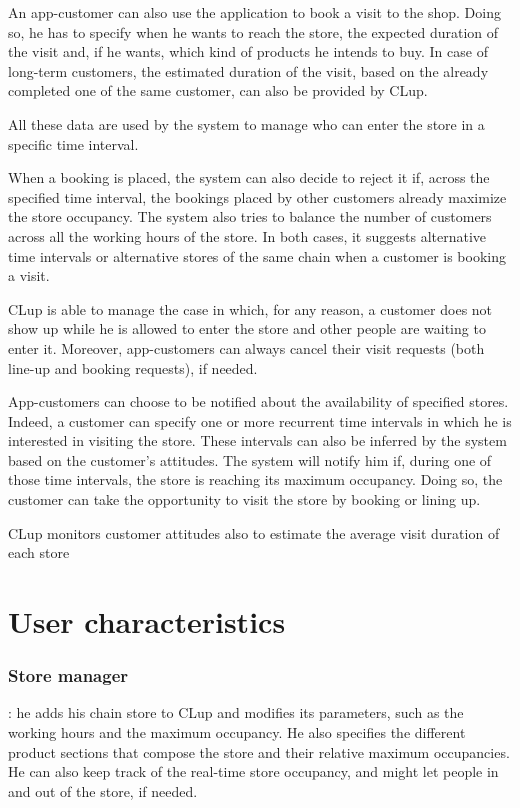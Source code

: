 \documentclass[a4paper,oneside,11pt]{book}   %
\begin{document}
    An app-customer can also use the application to book a visit to the shop. Doing so, he has to specify when he wants to reach the store, the expected duration of the visit and, if he wants, which kind of products he intends to buy. In case of long-term customers, the estimated duration of the visit, based on the already completed one of the same customer, can also be provided by CLup. \par
    All these data are used by the system to manage who can enter the store in a specific time interval. \par
    When a booking is placed, the system can also decide to reject it if, across the specified time interval, the bookings placed by other customers already maximize the store occupancy. The system also tries to balance the number of customers across all the working hours of the store. In both cases, it suggests alternative time intervals or alternative stores of the same chain when a customer is booking a visit. \par
    CLup is able to manage the case in which, for any reason, a customer does not show up while he is allowed to enter the store and other people are waiting to enter it. Moreover, app-customers can always cancel their visit requests (both line-up and booking requests), if needed. \par
    App-customers can choose to be notified about the availability of specified stores. Indeed, a customer can specify one or more recurrent time intervals in which he is interested in visiting the store. These intervals can also be inferred by the system based on the customer’s attitudes. The system will notify him if, during one of those time intervals, the store is reaching its maximum occupancy. Doing so, the customer can take the opportunity to visit the store by booking or lining up. \par
    CLup monitors customer attitudes also to estimate the average visit duration of each store

    \section{User characteristics}
    \subsubsection{Store manager}: he adds his chain store to CLup and modifies its parameters, such as the working hours and the maximum occupancy. He also specifies the different product sections that compose the store and their relative maximum occupancies. He can also keep track of the real-time store occupancy, and might let people in and out of the store, if needed.
\end{document}
